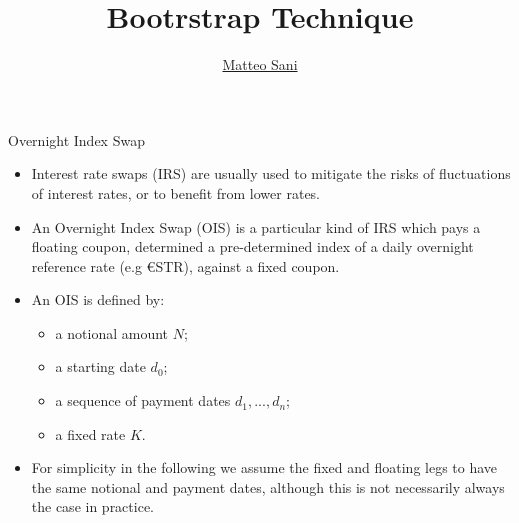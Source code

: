 \documentclass{beamer}
\title{Bootrstrap Technique}
\author{\href{mailto:matteo.sani@unisi.it}{Matteo Sani}}
\begin{document}
\begin{frame}[plain]
  \maketitle
\end{frame}

\begin{frame}{Overnight Index Swap}
\begin{itemize}
\item Interest rate swaps (IRS) are usually used to mitigate the risks of fluctuations of interest rates, or to benefit from lower rates. 
\item An Overnight Index Swap (OIS) is a particular kind of IRS which pays a floating coupon, determined a pre-determined index of a daily overnight reference rate (e.g €STR), against a fixed coupon.  
\item An OIS is defined by:
\begin{itemize}
  \item a notional amount $N$;
  \item a starting date $d_0$;
  \item a sequence of payment dates $d_1,...,d_n$;
  \item a fixed rate $K$.
\end{itemize}
\item For simplicity in the following we assume the fixed and floating legs to have the same notional and payment dates, although this is not necessarily always the case in practice.
\end{itemize}
\end{frame}
\end{document}
